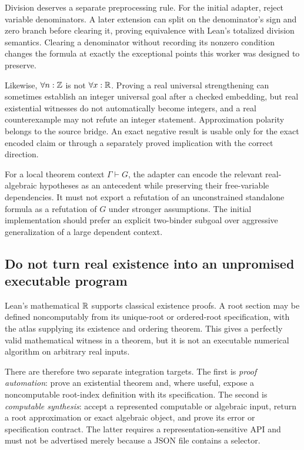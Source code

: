 Division deserves a separate preprocessing rule. For the initial adapter, reject variable denominators. A later extension can split on the denominator's sign and zero branch before clearing it, proving equivalence with Lean's totalized division semantics. Clearing a denominator without recording its nonzero condition changes the formula at exactly the exceptional points this worker was designed to preserve.

Likewise, $\forall n:\mathbb Z$ is not $\forall x:\mathbb R$. Proving a real universal strengthening can sometimes establish an integer universal goal after a checked embedding, but real existential witnesses do not automatically become integers, and a real counterexample may not refute an integer statement. Approximation polarity belongs to the source bridge. An exact negative result is usable only for the exact encoded claim or through a separately proved implication with the correct direction.

For a local theorem context $\Gamma\vdash G$, the adapter can encode the relevant real-algebraic hypotheses as an antecedent while preserving their free-variable dependencies. It must not export a refutation of an unconstrained standalone formula as a refutation of $G$ under stronger assumptions. The initial implementation should prefer an explicit two-binder subgoal over aggressive generalization of a large dependent context.

\subsection{Do not turn real existence into an unpromised executable program}
Lean's mathematical $\mathbb R$ supports classical existence proofs. A root section may be defined noncomputably from its unique-root or ordered-root specification, with the atlas supplying its existence and ordering theorem. This gives a perfectly valid mathematical witness in a theorem, but it is not an executable numerical algorithm on arbitrary real inputs.

There are therefore two separate integration targets. The first is \emph{proof automation}: prove an existential theorem and, where useful, expose a noncomputable root-index definition with its specification. The second is \emph{computable synthesis}: accept a represented computable or algebraic input, return a root approximation or exact algebraic object, and prove its error or specification contract. The latter requires a representation-sensitive API and must not be advertised merely because a JSON file contains a selector.

